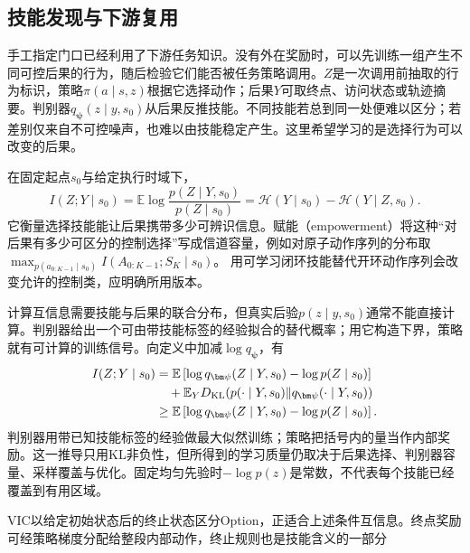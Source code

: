 \subsection{技能发现与下游复用}
\label{sec:rl-learning-skill-discovery}

手工指定门口已经利用了下游任务知识。没有外在奖励时，可以先训练一组产生不同可控后果的行为，随后检验它们能否被任务策略调用。$Z$是一次调用前抽取的行为标识，策略$\pi(a\mid s,z)$根据它选择动作；后果$Y$可取终点、访问状态或轨迹摘要。判别器$q_{\bm\psi}(z\mid y,s_0)$从后果反推技能。不同技能若总到同一处便难以区分；若差别仅来自不可控噪声，也难以由技能稳定产生。这里希望学习的是选择行为可以改变的后果。

\begin{definition}[互信息与赋能的控制含义]
  \label{def:rl-learning-empowerment}
  在固定起点$s_0$与给定执行时域下，
  \[
    I(Z;Y\mid s_0)
      =\mathbb E\log\frac{p(Z\mid Y,s_0)}{p(Z\mid s_0)}
      =\mathcal H(Y\mid s_0)-\mathcal H(Y\mid Z,s_0).
  \]
  它衡量选择技能能让后果携带多少可辨识信息。赋能（empowerment）将这种“对后果有多少可区分的控制选择”写成信道容量，例如对原子动作序列的分布取
  $\max_{p(a_{0:K-1}\mid s_0)}I(A_{0:K-1};S_K\mid s_0)$。
  用可学习闭环技能替代开环动作序列会改变允许的控制类，应明确所用版本。
\end{definition}

计算互信息需要技能与后果的联合分布，但真实后验$p(z\mid y,s_0)$通常不能直接计算。判别器给出一个可由带技能标签的经验拟合的替代概率；用它构造下界，策略就有可计算的训练信号。向定义中加减$\log q_{\bm\psi}$，有
\begin{align}
 I(Z;Y\mid s_0)
   &=\mathbb E\left[\log q_{\bm\psi}(Z\mid Y,s_0)
                                  -\log p(Z\mid s_0)\right]\notag\\
   &\quad+\mathbb E_Y D_{\mathrm{KL}}
       (p(\cdot\mid Y,s_0)\|q_{\bm\psi}(\cdot\mid Y,s_0))\notag\\
   &\geq\mathbb E\left[\log q_{\bm\psi}(Z\mid Y,s_0)
                                  -\log p(Z\mid s_0)\right].
 \label{eq:rl-learning-skill-mi}
\end{align}
判别器用带已知技能标签的经验做最大似然训练；策略把括号内的量当作内部奖励。这一推导只用KL非负性，但所得到的学习质量仍取决于后果选择、判别器容量、采样覆盖与优化。固定均匀先验时$-\log p(z)$是常数，不代表每个技能已经覆盖到有用区域。

VIC以给定初始状态后的终止状态区分Option，正适合上述条件互信息。终点奖励可经策略梯度分配给整段内部动作，终止规则也是技能含义的一部分

